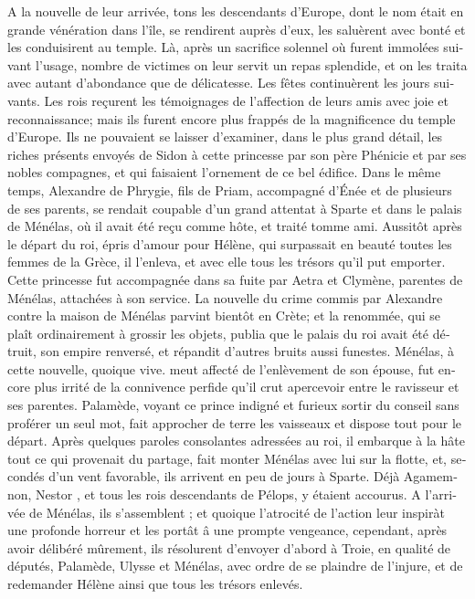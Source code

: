 \documentclass{article}
\begin{document}
\begin{pages}
\begin{Leftside}
\begin{french}
A la nouvelle de leur arrivée, tons les descendants d'Europe, dont le nom était en grande vénération dans l'île, se rendirent auprès d'eux, les saluèrent avec bonté et les conduisirent au temple. Là, après un sacrifice solennel où furent immolées suivant l'usage, nombre de victimes on leur servit un repas splendide, et on les traita avec autant d'abondance que de délicatesse. Les fêtes continuèrent les jours suivants. Les rois reçurent les témoignages de l'affection de leurs amis avec joie et reconnaissance; mais ils furent encore plus frappés de la magnificence du temple d'Europe. Ils ne pouvaient se laisser d'examiner, dans le plus grand détail, les riches présents envoyés de Sidon à cette princesse par son père Phénicie et par ses nobles compagnes, et qui faisaient l'ornement de ce bel édifice.
 \pend
 \pstart
Dans le même temps, Alexandre de Phrygie, fils de Priam, accompagné d'Énée et de plusieurs de ses parents, se rendait coupable d'un grand attentat à Sparte et dans le palais de Ménélas, où il avait été reçu comme hôte, et traité tomme ami. Aussitôt après le départ du roi, épris d'amour pour Hélène, qui surpassait en beauté toutes les femmes de la Grèce, il l'enleva, et avec elle tous les trésors qu'il put emporter. Cette princesse fut accompagnée dans sa fuite par Aetra et Clymène, parentes de Ménélas, attachées à son service. La nouvelle du crime commis par Alexandre contre la maison de Ménélas parvint bientôt en Crète; et la renommée, qui se plaît ordinairement à grossir les objets, publia que le palais du roi avait été détruit, son empire renversé, et répandit d'autres bruits aussi funestes.
 \pend
 \pstart
Ménélas, à cette nouvelle, quoique vive. meut affecté de l'enlèvement de son épouse, fut encore plus irrité de la connivence perfide qu'il crut apercevoir entre le ravisseur et ses parentes. Palamède, voyant ce prince indigné et furieux sortir du conseil sans proférer un seul mot, fait approcher de terre les vaisseaux et dispose tout pour le départ. Après quelques paroles consolantes adressées au roi, il embarque à la hâte tout ce qui provenait du partage, fait monter Ménélas avec lui sur la flotte, et, secondés d'un vent favorable, ils arrivent en peu de jours à Sparte. Déjà Agamemnon, Nestor , et tous les rois descendants de Pélops, y étaient accourus. A l'arrivée de Ménélas, ils s'assemblent ; et quoique l'atrocité de l'action leur inspiràt une profonde horreur et les portât â une prompte vengeance, cependant, après avoir délibéré mûrement, ils résolurent d'envoyer d'abord à Troie, en qualité de députés, Palamède, Ulysse et Ménélas, avec ordre de se plaindre de l'injure, et de redemander Hélène ainsi que tous les trésors enlevés.
\pend
\endnumbering
\end{french}
\end{Leftside}

\Pages

\end{pages}
\end{document}
